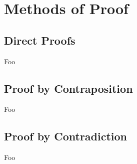 \section{Methods of Proof}

\subsection{Direct Proofs}

Foo

\subsection{Proof by Contraposition}

Foo

\subsection{Proof by Contradiction}

Foo

